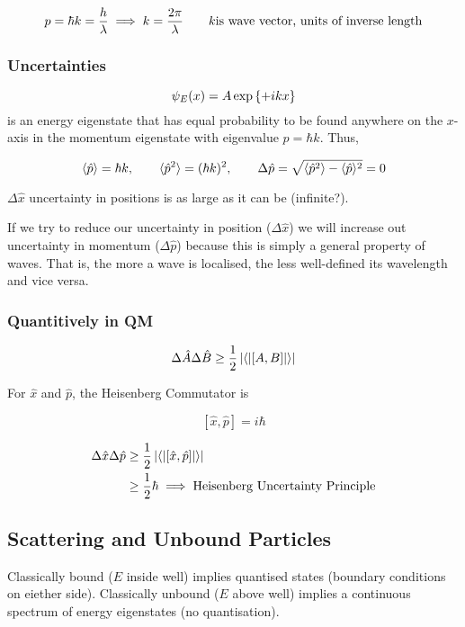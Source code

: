 \documentclass[english, 11pt]{article}
\begin{document}
      \[ p = \hbar k = \frac{h}{\lambda} \implies k = \frac{2\pi}{\lambda} \ \ \ \ \ \ k \mbox{is wave vector, units of inverse length} \]

      \subsubsection{Uncertainties}

      \[ \psi_E(x) = A\exp \left\{ +ikx \right\} \]
      is an energy eigenstate that has equal probability to be found anywhere on the $x$-axis in the momentum eigenstate with eigenvalue $p = \hbar k$. Thus,

      \[ \E{\hat{p}} = \hbar k, \ \ \ \ \ \ \E{\hat{p}^2} = (\hbar k)^2,  \ \ \ \ \ \ \Delta \hat{p} = \sqrt{\E{\hat{p}^2} - \E{\hat{p}}^2} = 0 \]

      $\Delta \hat{x}$ uncertainty in positions is as large as it can be (infinite?). \newline

      If we try to reduce our uncertainty in position ($\Delta \hat{x}$) we will increase out uncertainty in momentum ($\Delta \hat{p}$) because this is simply a general property of waves. That is, the more a wave is localised, the less well-defined its wavelength and vice versa.

      \subsubsection{Quantitively in QM}

      \[ \Delta \hat{A} \Delta \hat{B} \geq \frac{1}{2} \left|\langle\left|\left[A,B\right]\right|\rangle\right| \]

      For $\hat{x}$ and $\hat{p}$, the Heisenberg Commutator is

      \[ [\hat{x},\hat{p}] = i\hbar \]

      \begin{align*}
        \Delta \hat{x} \Delta \hat{p} & \geq \frac{1}{2} \left|\langle\left|\left[\hat{x},\hat{p}\right]\right|\rangle\right| \\
        & \geq \frac{1}{2} \hbar \implies \mbox{Heisenberg Uncertainty Principle}
      \end{align*}

    \subsection{Scattering and Unbound Particles}

      Classically bound ($E$ inside well) implies quantised states (boundary conditions on eiether side).\newline
      Classically unbound ($E$ above well) implies a continuous spectrum of energy eigenstates (no quantisation). \newline
\end{document}

